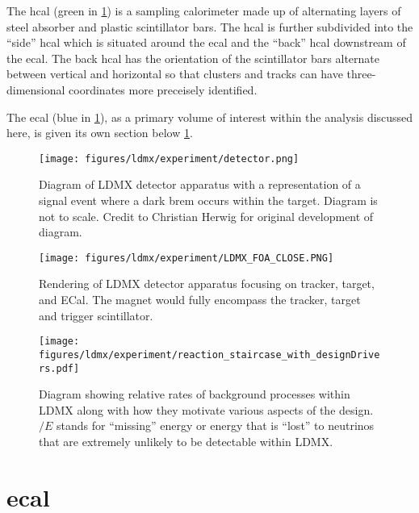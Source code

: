 The \gls{hcal} (green in \cref{fig:ldmx-det}) is a sampling calorimeter made up of alternating layers of steel absorber and
plastic scintillator bars. The \gls{hcal} is further subdivided into the ``side'' \gls{hcal} which
is situated around the \gls{ecal} and the ``back'' \gls{hcal} downstream of the \gls{ecal}. The back \gls{hcal}
has the orientation of the scintillator bars alternate between vertical and horizontal
so that clusters and tracks can have three-dimensional coordinates more preceisely identified.

The \gls{ecal} (blue in \cref{fig:ldmx-det}), as a primary volume of interest within the analysis discussed here, is given its
own section below \cref{sec:ldmx:ecal}.

\begin{figure}
    \centering
    \texttt{[image: figures/ldmx/experiment/detector.png]}
    \caption{
        Diagram of LDMX detector apparatus with a representation of a signal event where
        a dark brem occurs within the target. Diagram is not to scale. Credit to Christian Herwig
        for original development of diagram.
    }
    \label{fig:ldmx-det}
\end{figure}

\begin{figure}
    \centering
    \texttt{[image: figures/ldmx/experiment/LDMX\_FOA\_CLOSE.PNG]}
    \caption{
        Rendering of LDMX detector apparatus focusing on tracker, target, and ECal.
        The magnet would fully encompass the tracker, target and trigger scintillator.
    }
    \label{fig:ldmx-render}
\end{figure}

\begin{figure}
    \centering
    \texttt{[image: figures/ldmx/experiment/reaction\_staircase\_with\_designDrivers.pdf]}
    \caption{
        Diagram showing relative rates of background processes within LDMX along with
        how they motivate various aspects of the design. $\slash{E}$ stands for ``missing''
        energy or energy that is ``lost'' to neutrinos that are extremely unlikely to be
        detectable within LDMX.
    }
    \label{fig:ldmx-bkgd-staircase}
\end{figure}

\section{\gls{ecal}}
\label{sec:ldmx:ecal}

